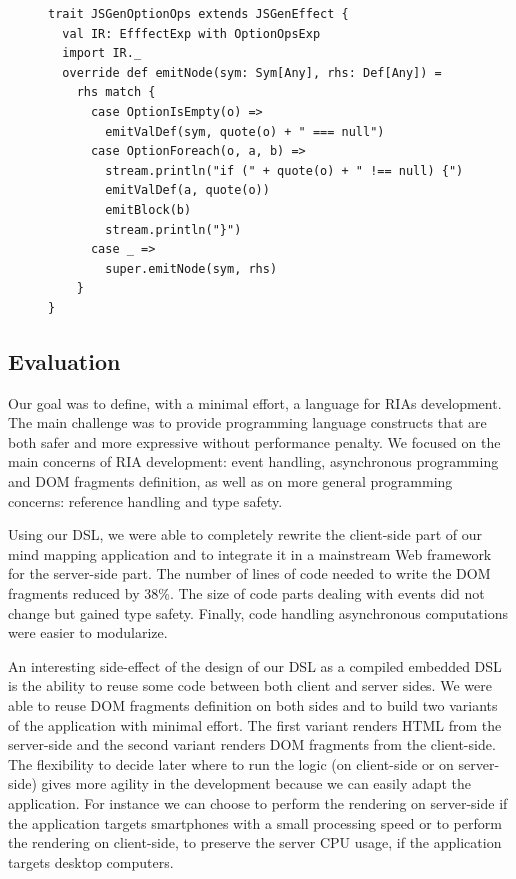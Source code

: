 \documentclass[american,english,runningheads]{llncs}
\begin{document}
\begin{figure}
\begin{lstlisting}[caption=Null reference handling DSL code generator,label=option-codegen]
trait JSGenOptionOps extends JSGenEffect {
  val IR: EfffectExp with OptionOpsExp
  import IR._
  override def emitNode(sym: Sym[Any], rhs: Def[Any]) =
    rhs match {
      case OptionIsEmpty(o) =>
        emitValDef(sym, quote(o) + " === null")
      case OptionForeach(o, a, b) =>
        stream.println("if (" + quote(o) + " !== null) {")
        emitValDef(a, quote(o))
        emitBlock(b)
        stream.println("}")
      case _ =>
        super.emitNode(sym, rhs)
    }
}
\end{lstlisting}
\end{figure}

\subsection{Evaluation}

Our goal was to define, with a minimal effort, a language for RIAs development. The main challenge was to provide
programming language constructs that are both safer and more expressive without performance penalty. We focused on
the main concerns of RIA development: event handling, asynchronous programming and DOM fragments definition, as well
as on more general programming concerns:  reference handling and type safety.

Using our DSL, we were able to completely rewrite the client-side part of our mind mapping application and to
integrate it in a mainstream Web framework for the server-side part. The number of
lines of code needed to write the DOM fragments reduced by 38\%. The size of code parts dealing with events did not
change but gained type safety. Finally, code handling asynchronous computations were easier to modularize.

An interesting side-effect of the design of our DSL as a compiled embedded DSL is the ability to reuse some code
between both client and server sides. We were able to reuse DOM fragments definition on both sides and to build two
variants of the application with minimal effort. The first variant renders HTML from the server-side and the second
variant renders DOM fragments from the client-side. The flexibility to decide later where to run the logic (on
client-side or on server-side) gives more agility in the development because we can easily adapt the application. For
instance we can choose to perform the rendering on server-side if the application targets smartphones with a small
processing speed or to perform the rendering on client-side, to preserve the server CPU usage, if the application
targets desktop computers.
\end{document}
